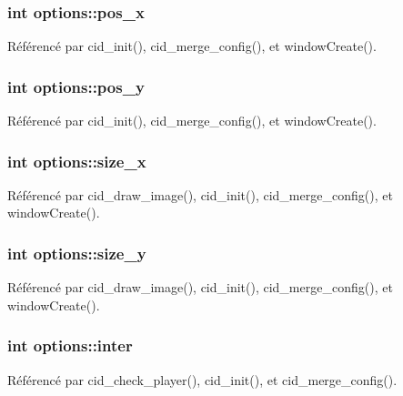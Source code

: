 \subsubsection{\setlength{\rightskip}{0pt plus 5cm}int {\bf options::pos\_\-x}}\label{structoptions_5418b53c2d26eeedb0af59105a5fb578}




Référencé par cid\_\-init(), cid\_\-merge\_\-config(), et windowCreate().
\subsubsection{\setlength{\rightskip}{0pt plus 5cm}int {\bf options::pos\_\-y}}\label{structoptions_b6b7a100ba52accfa7a3875174268542}




Référencé par cid\_\-init(), cid\_\-merge\_\-config(), et windowCreate().
\subsubsection{\setlength{\rightskip}{0pt plus 5cm}int {\bf options::size\_\-x}}\label{structoptions_2b0b381e09933454fca253b18f74593f}




Référencé par cid\_\-draw\_\-image(), cid\_\-init(), cid\_\-merge\_\-config(), et windowCreate().
\subsubsection{\setlength{\rightskip}{0pt plus 5cm}int {\bf options::size\_\-y}}\label{structoptions_8078447e6b9d2fb5e42092b2069af104}




Référencé par cid\_\-draw\_\-image(), cid\_\-init(), cid\_\-merge\_\-config(), et windowCreate().
\subsubsection{\setlength{\rightskip}{0pt plus 5cm}int {\bf options::inter}}\label{structoptions_304f275964a26beefdd05b6764db8225}




Référencé par cid\_\-check\_\-player(), cid\_\-init(), et cid\_\-merge\_\-config().
